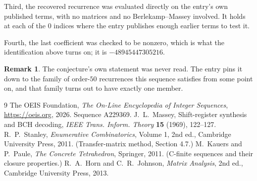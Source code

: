 \documentclass[11pt,a4paper]{article}
\theoremstyle{plain}
\theoremstyle{definition}
\newtheorem{remark}[theorem]{Remark}
\begin{document}
Third, the recovered recurrence was evaluated directly on the entry's own published terms, with
no matrices and no Berlekamp--Massey involved. It holds at each of the $0$ indices where
the entry publishes enough earlier terms to test it.

Fourth, the last coefficient was checked to be nonzero, which is what the identification above
turns on; it is $-48945447305216$.

\begin{remark}
The conjecture's own statement was never read. The entry pins it down to the family of
order-$50$ recurrences this sequence satisfies from some point on, and that family turns
out to have exactly one member.
\end{remark}

\begin{thebibliography}{9}
 The OEIS Foundation, \emph{The On-Line Encyclopedia of Integer
Sequences}, \url{https://oeis.org}, 2026. Sequence A229369.
 J.~L.~Massey, Shift-register synthesis and BCH decoding, \emph{IEEE
Trans. Inform. Theory} \textbf{15} (1969), 122--127.
 R.~P.~Stanley, \emph{Enumerative Combinatorics}, Volume 1, 2nd ed.,
Cambridge University Press, 2011. (Transfer-matrix method, Section 4.7.)
 M.~Kauers and P.~Paule, \emph{The Concrete Tetrahedron}, Springer, 2011.
(C-finite sequences and their closure properties.)
 R.~A.~Horn and C.~R.~Johnson, \emph{Matrix Analysis}, 2nd ed., Cambridge
University Press, 2013.
\end{thebibliography}
\end{document}
